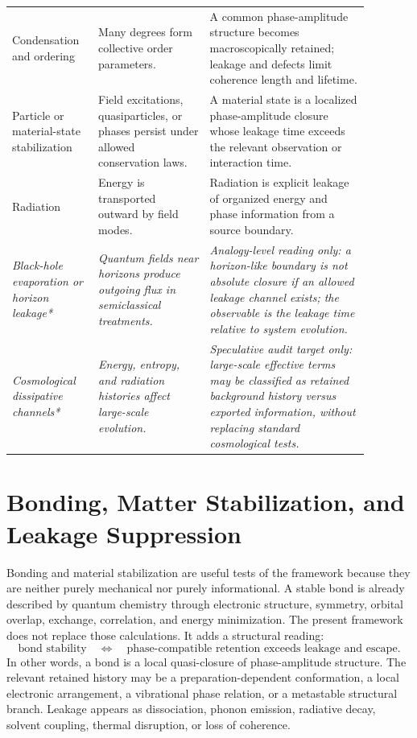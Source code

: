 \documentclass[11pt,a4paper]{article}
\begin{document}
\begin{center}
\begin{tabular}{L{0.19\linewidth}L{0.29\linewidth}L{0.40\linewidth}}
Condensation and ordering & Many degrees form collective order parameters. & A common phase-amplitude structure becomes macroscopically retained; leakage and defects limit coherence length and lifetime. \\
Particle or material-state stabilization & Field excitations, quasiparticles, or phases persist under allowed conservation laws. & A material state is a localized phase-amplitude closure whose leakage time exceeds the relevant observation or interaction time. \\
Radiation & Energy is transported outward by field modes. & Radiation is explicit leakage of organized energy and phase information from a source boundary. \\
\midrule
\emph{Black-hole evaporation or horizon leakage*} & \emph{Quantum fields near horizons produce outgoing flux in semiclassical treatments.} & \emph{Analogy-level reading only: a horizon-like boundary is not absolute closure if an allowed leakage channel exists; the observable is the leakage time relative to system evolution.} \\
\emph{Cosmological dissipative channels*} & \emph{Energy, entropy, and radiation histories affect large-scale evolution.} & \emph{Speculative audit target only: large-scale effective terms may be classified as retained background history versus exported information, without replacing standard cosmological tests.} \\
\bottomrule
\end{tabular}
\label{tab:physical-correspondence}
\end{center}

\section{Bonding, Matter Stabilization, and Leakage Suppression}
Bonding and material stabilization are useful tests of the framework because they are neither purely mechanical nor purely informational.  A stable bond is already described by quantum chemistry through electronic structure, symmetry, orbital overlap, exchange, correlation, and energy minimization.  The present framework does not replace those calculations.  It adds a structural reading:
\begin{equation}
  \text{bond stability}
  \quad\Longleftrightarrow\quad
  \text{phase-compatible retention exceeds leakage and escape}.
  \label{eq:bond-reading}
\end{equation}
In other words, a bond is a local quasi-closure of phase-amplitude structure.  The relevant retained history may be a preparation-dependent conformation, a local electronic arrangement, a vibrational phase relation, or a metastable structural branch.  Leakage appears as dissociation, phonon emission, radiative decay, solvent coupling, thermal disruption, or loss of coherence.
\end{document}
